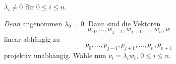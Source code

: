 \begin{behauptung*}
  \( \lambda_i\neq 0 \) für \( 0\leq i\leq n \).
\end{behauptung*}
\emph{Denn} angenommen \( \lambda_0=0 \). Dann sind die Vektoren
\begin{equation*}
  w_0,\dotsc,w_{j-1},w_{j+1},\dotsc,w_n,w
\end{equation*}
linear abhängig \contra zu 
\begin{equation*}
  p_0,\dotsc,p_{j-1},p_{j+1},\dotsc,p_n,p_{n+1}
\end{equation*}
projektiv unabhängig. Wähle nun \( v_i=\lambda_i w_i \), \( 0\leq i\leq n \).
